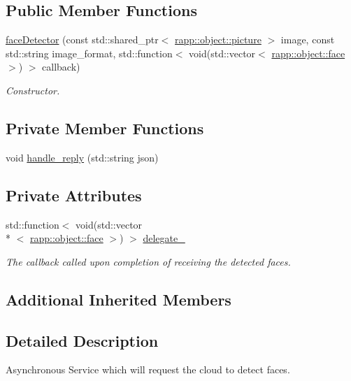 \subsection*{Public Member Functions}
\begin{DoxyCompactItemize}
\item 
\hyperlink{classrapp_1_1cloud_1_1faceDetector_af693e139e042aaa52c235fcd768712bc}{face\-Detector} (const std\-::shared\-\_\-ptr$<$ \hyperlink{classrapp_1_1object_1_1picture}{rapp\-::object\-::picture} $>$ image, const std\-::string image\-\_\-format, std\-::function$<$ void(std\-::vector$<$ \hyperlink{classrapp_1_1object_1_1face}{rapp\-::object\-::face} $>$) $>$ callback)
\begin{DoxyCompactList}\small\item\em Constructor. \end{DoxyCompactList}\end{DoxyCompactItemize}
\subsection*{Private Member Functions}
\begin{DoxyCompactItemize}
\item 
void \hyperlink{classrapp_1_1cloud_1_1faceDetector_aa62da7d9f2fb7e45fabd5612ae139e46}{handle\-\_\-reply} (std\-::string json)
\end{DoxyCompactItemize}
\subsection*{Private Attributes}
\begin{DoxyCompactItemize}
\item 
std\-::function$<$ void(std\-::vector\\*
$<$ \hyperlink{classrapp_1_1object_1_1face}{rapp\-::object\-::face} $>$) $>$ \hyperlink{classrapp_1_1cloud_1_1faceDetector_ac55aa1de64dec76c3d330e9ce5da9556}{delegate\-\_\-}
\begin{DoxyCompactList}\small\item\em The callback called upon completion of receiving the detected faces. \end{DoxyCompactList}\end{DoxyCompactItemize}
\subsection*{Additional Inherited Members}


\subsection{Detailed Description}
Asynchronous Service which will request the cloud to detect faces. 

